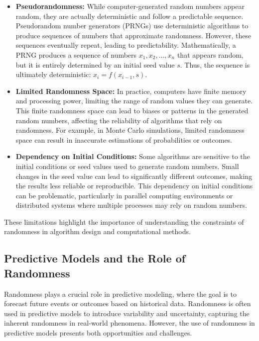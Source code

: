 \documentclass[12pt]{book} %
\begin{document}
\begin{itemize}
    \item \textbf{Pseudorandomness:} While computer-generated random numbers appear random, they are actually deterministic and follow a predictable sequence. Pseudorandom number generators (PRNGs) use deterministic algorithms to produce sequences of numbers that approximate randomness. However, these sequences eventually repeat, leading to predictability. Mathematically, a PRNG produces a sequence of numbers \(x_1, x_2, \ldots, x_n\) that appears random, but it is entirely determined by an initial seed value \(s\). Thus, the sequence is ultimately deterministic: \(x_i = f(x_{i-1}, s)\).
    
    \item \textbf{Limited Randomness Space:} In practice, computers have finite memory and processing power, limiting the range of random values they can generate. This finite randomness space can lead to biases or patterns in the generated random numbers, affecting the reliability of algorithms that rely on randomness. For example, in Monte Carlo simulations, limited randomness space can result in inaccurate estimations of probabilities or outcomes.
    
    \item \textbf{Dependency on Initial Conditions:} Some algorithms are sensitive to the initial conditions or seed values used to generate random numbers. Small changes in the seed value can lead to significantly different outcomes, making the results less reliable or reproducible. This dependency on initial conditions can be problematic, particularly in parallel computing environments or distributed systems where multiple processes may rely on random numbers.
\end{itemize}

These limitations highlight the importance of understanding the constraints of randomness in algorithm design and computational methods.

\subsection{Predictive Models and the Role of Randomness}
Randomness plays a crucial role in predictive modeling, where the goal is to forecast future events or outcomes based on historical data. Randomness is often used in predictive models to introduce variability and uncertainty, capturing the inherent randomness in real-world phenomena. However, the use of randomness in predictive models presents both opportunities and challenges.
\end{document}
